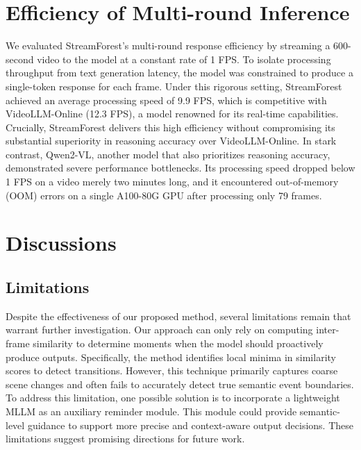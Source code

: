 \section{Efficiency of Multi-round Inference}
\label{app:sec:Efficiency_Multi-round}
We evaluated StreamForest's multi-round response efficiency by streaming a 600-second video to the model at a constant rate of 1 FPS. To isolate processing throughput from text generation latency, the model was constrained to produce a single-token response for each frame. Under this rigorous setting, StreamForest achieved an average processing speed of 9.9 FPS, which is competitive with VideoLLM-Online (12.3 FPS), a model renowned for its real-time capabilities.
Crucially, StreamForest delivers this high efficiency without compromising its substantial superiority in reasoning accuracy over VideoLLM-Online. In stark contrast, Qwen2-VL, another model that also prioritizes reasoning accuracy, demonstrated severe performance bottlenecks. Its processing speed dropped below 1 FPS on a video merely two minutes long, and it encountered out-of-memory (OOM) errors on a single A100-80G GPU after processing only 79 frames.





\section{Discussions}
\label{app:sec:Discussions}
\subsection{Limitations}
\label{app:sec:Discussions:Limitations}

Despite the effectiveness of our proposed method, several limitations remain that warrant further investigation.
%
Our approach can only rely on computing inter-frame similarity to determine moments when the model should proactively produce outputs. Specifically, the method identifies local minima in similarity scores to detect transitions. However, this technique primarily captures coarse scene changes and often fails to accurately detect true semantic event boundaries. To address this limitation, one possible solution is to incorporate a lightweight MLLM as an auxiliary reminder module. This module could provide semantic-level guidance to support more precise and context-aware output decisions.
%
These limitations suggest promising directions for future work.


